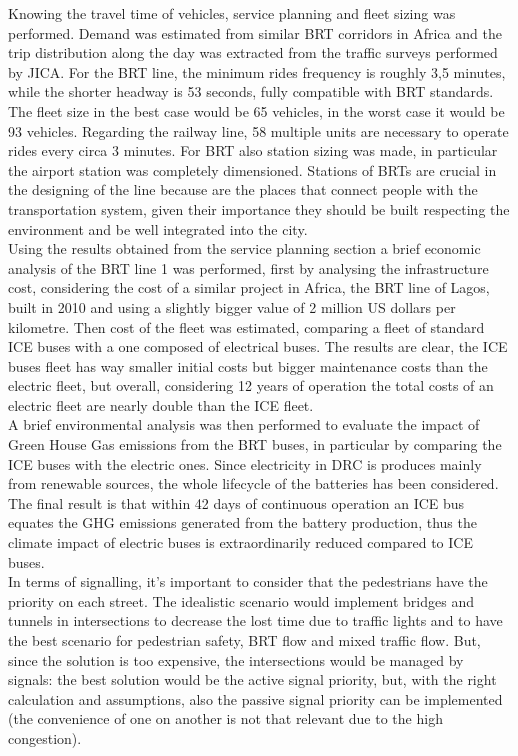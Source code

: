 \documentclass{article}
\begin{document}
Knowing the travel time of vehicles, service planning and fleet sizing was performed. Demand was estimated from similar BRT corridors in Africa and the trip distribution along the day was extracted from the traffic surveys performed by JICA. For the BRT line, the minimum rides frequency is roughly 3,5 minutes, while the shorter headway is 53 seconds, fully compatible with BRT standards. The fleet size in the best case would be 65 vehicles, in the worst case it would be 93 vehicles. Regarding the railway line, 58 multiple units are necessary to operate rides every circa 3 minutes. For BRT also station sizing was made, in particular the airport station was completely dimensioned. Stations of BRTs are crucial in the designing of the line because are the places that connect people with the transportation system, given their importance they should be built respecting the environment and be well integrated into the city.\\
Using the results obtained from the service planning section a brief economic analysis of the BRT line 1 was performed, first by analysing the infrastructure cost, considering the cost of a similar project in Africa, the BRT line of Lagos, built in 2010 and using a slightly bigger value of 2 million US dollars per kilometre. Then cost of the fleet was estimated, comparing a fleet of standard ICE buses with a one composed of electrical buses. The results are clear, the ICE buses fleet has way smaller initial costs but bigger maintenance costs than the electric fleet, but overall, considering 12 years of operation the total costs of an electric fleet are nearly double than the ICE fleet.\\
 A brief environmental analysis was then performed to evaluate the impact of Green House Gas emissions from the BRT buses, in particular by comparing the ICE buses with the electric ones. Since electricity in DRC is produces mainly from renewable sources, the whole lifecycle of the batteries has been considered. The final result is that within 42 days of continuous operation an ICE bus equates the GHG emissions generated from the battery production, thus the climate impact of electric buses is extraordinarily reduced compared to ICE buses.\\
In terms of signalling, it’s important to consider that the pedestrians have the priority on each street. The idealistic scenario would implement bridges and tunnels in intersections to decrease the lost time due to traffic lights and to have the best scenario for pedestrian safety, BRT flow and mixed traffic flow. But, since the solution is too expensive, the intersections would be managed by signals: the best solution would be the active signal priority, but, with the right calculation and assumptions, also the passive signal priority can be implemented (the convenience of one on another is not that relevant due to the high congestion).\\
\end{document}
